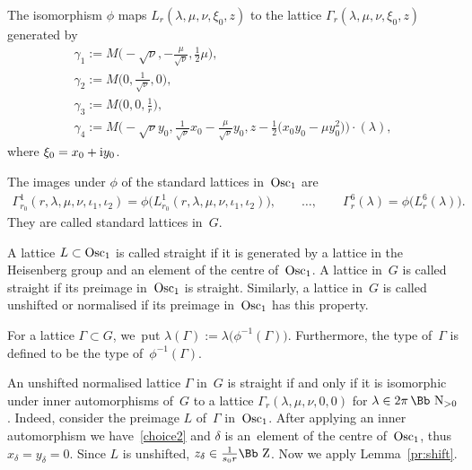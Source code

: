 \documentclass[pdftex]{sigma}
\newcommand\NN{{\mbox{\Bb N}}}
\newcommand\ZZ{{\mbox{\Bb Z}}}
\newcommand{\Osc}{{\rm Osc}}
\numberwithin{equation}{section}
\begin{document}
The isomorphism $\phi$ maps $L_r(\lambda,\mu,\nu,\xi_0,z)$ to the lattice $\Gamma_r(\lambda,\mu,\nu,\xi_0,z)$ generated by
\begin{gather}
\gamma_1:= M\bigg({-}\sqrt\nu,-\frac{\mu}{\sqrt\nu},\frac{1}{2}\mu\bigg), \label{g1}
\\
\gamma_2:= M\bigg(0,\frac{1}{\sqrt\nu},0\bigg), \label{g2}
\\
\gamma_3:= M\bigg(0,0,\frac{1}{r}\bigg), \label{g3}
\\
\gamma_4:= M\bigg({-}\sqrt\nu y_0,\frac{1}{\sqrt\nu} x_0-\frac{\mu}{\sqrt\nu} y_0,z-\frac{1}{2}\big(x_0 y_0-\mu y_0^2\big)\bigg)\cdot(\lambda), \label{g4}
\end{gather}
where $\xi_0=x_0+{\rm i}y_0$.

The images under $\phi$ of the standard lattices in~$\Osc_1$ are
\begin{gather*}
\Gamma^1_{r_0}(r,\lambda,\mu,\nu,\iota_1,\iota_2) = \phi\big(L^1_{r_0}(r,\lambda,\mu,\nu,\iota_1,\iota_2)\big),\qquad\dots,\qquad
\Gamma^6_r(\lambda)=\phi\big(L^6_r(\lambda)\big).
\end{gather*}
They are called standard lattices in~$G$.

\begin{Definition} A lattice $L\subset \Osc_1$ is called straight if it is generated by a lattice in the Heisenberg group and an element of the centre of~$\Osc_1$. A lattice in~$G$ is called straight if its preimage in~$\Osc_1$ is straight. Similarly, a lattice in~$G$ is called unshifted or normalised if its preimage in~$\Osc_1$ has this property.
\end{Definition}
\begin{Definition} For a lattice $\Gamma\subset G$, we~put $\lambda(\Gamma):=\lambda\big(\phi^{-1}(\Gamma)\big)$. Furthermore, the type of~$\Gamma$ is defined to be the type of~$\phi^{-1}(\Gamma)$.
\end{Definition}
\begin{Remark}
An unshifted normalised lattice $\Gamma$ in~$G$ is straight if and only if it is isomorphic under inner automorphisms of~$G$ to a lattice $\Gamma_r(\lambda,\mu,\nu,0,0)$ for $\lambda\in2\pi\,\NN_{>0}$. Indeed, consider the preimage $L$ of~$\Gamma$ in~$\Osc_1$. After applying an inner automorphism we have~\eqref{choice2} and $\delta$ is an~element of the centre of~$\Osc_1$, thus $x_\delta=y_\delta=0$. Since $L$ is unshifted, $z_\delta\in\frac 1{s_0r}\ZZ$. Now we apply Lemma~\ref{pr:shift}.
\end{Remark}
\end{document}
